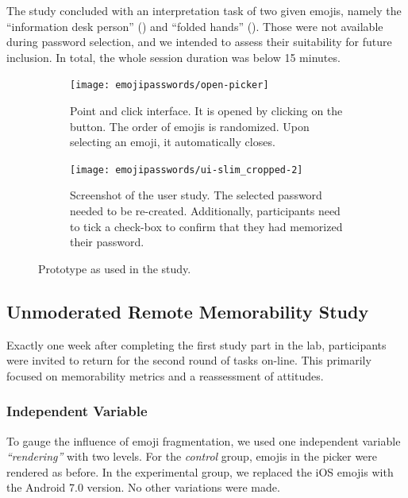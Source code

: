 The study concluded with an interpretation task of two given emojis, namely the ``information desk person'' () and ``folded hands'' (). Those were not available during password selection, and we intended to assess their suitability for future inclusion. In total, the whole session duration was below 15 minutes.

\begin{figure}
	\centering
	\begin{subfigure}[t]{0.49\textwidth}
		\texttt{[image: emojipasswords/open-picker]}
		\caption{\label{fig:emojipasswords:ui-open-picker} Point and click interface. It is opened by clicking on the  button. The order of emojis is randomized. Upon selecting an emoji, it automatically closes.}
	\end{subfigure}
	\begin{subfigure}[t]{0.49\textwidth}
		\texttt{[image: emojipasswords/ui-slim\_cropped-2]}
		\caption{\label{fig:emojipasswords:policy-memo-instruction} Screenshot of the user study. The selected password needed to be re-created. Additionally, participants need to tick a check-box to confirm that they had memorized their password.}
	\end{subfigure}
	\caption{\label{fig:emojipasswords:prototype} Prototype as used in the study.}
\end{figure}

\subsection{Unmoderated Remote Memorability Study}
Exactly one week after completing the first study part in the lab, participants were invited to return for the second round of tasks on-line. This primarily focused on memorability metrics and a reassessment of attitudes. 
\subsubsection{Independent Variable}
To gauge the influence of emoji fragmentation, we used one independent variable \textit{``rendering''} with two levels. For the \textit{control} group, emojis in the picker were rendered as before. In the experimental group, we replaced the iOS emojis with the Android 7.0 version. No other variations were made. 
